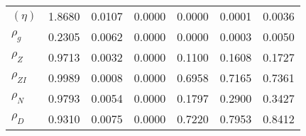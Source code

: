 \begin{center}
\begin{longtable}{lcccccc}
$ (\eta)              $	 & 	          1.8680	 & 	          0.0107	 & 	          0.0000	 & 	          0.0000	 & 	          0.0001	 & 	          0.0036 \\ 
$ {\rho_g}            $	 & 	          0.2305	 & 	          0.0062	 & 	          0.0000	 & 	          0.0000	 & 	          0.0003	 & 	          0.0050 \\ 
$ {\rho_Z}            $	 & 	          0.9713	 & 	          0.0032	 & 	          0.0000	 & 	          0.1100	 & 	          0.1608	 & 	          0.1727 \\ 
$ {\rho_{ZI}}         $	 & 	          0.9989	 & 	          0.0008	 & 	          0.0000	 & 	          0.6958	 & 	          0.7165	 & 	          0.7361 \\ 
$ {\rho_N}            $	 & 	          0.9793	 & 	          0.0054	 & 	          0.0000	 & 	          0.1797	 & 	          0.2900	 & 	          0.3427 \\ 
$ {\rho_D}            $	 & 	          0.9310	 & 	          0.0075	 & 	          0.0000	 & 	          0.7220	 & 	          0.7953	 & 	          0.8412 \\ 
\end{longtable}
 \end{center}
